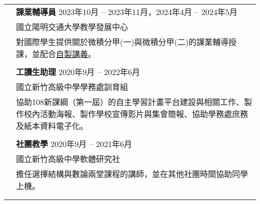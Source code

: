 \documentclass[letterpaper, 11pt]{article}
\begin{document}
\begin{CJK*}{UTF8}{bsmi}
\begin{center}
\begin{longtable}{p{0.72in}p{5.97in}}
        & \textbf{課業輔導員} \hfill 2023年10月 -- 2023年11月，2024年4月 -- 2024年5月 \\
        & 國立陽明交通大學教學發展中心\\
        & 對國際學生提供關於微積分甲(一)與微積分甲(二)的課業輔導授課，並配合\href{https://github.com/eiken59/2024_II_Tutor}{自製講義}。\\
        & \\


        
        & \textbf{工讀生助理} \hfill 2020年9月 -- 2022年6月 \\
        & 國立新竹高級中學學務處訓育組\\
        & 協助108新課綱（第一屆）的自主學習計畫平台建設與相關工作、製作校內活動海報、製作學校宣傳影片與集會簡報、協助學務處庶務及紙本資料電子化。\\
        & \\

        & \textbf{社團教學} \hfill 2020年9月 -- 2021年6月 \\
        & 國立新竹高級中學軟體研究社\\
        & 擔任選擇結構與數論兩堂課程的講師，並在其他社團時間協助同學上機。\\
        & \\

        & \\
        

\end{longtable}
\end{center}
\end{CJK*}
\end{document}
